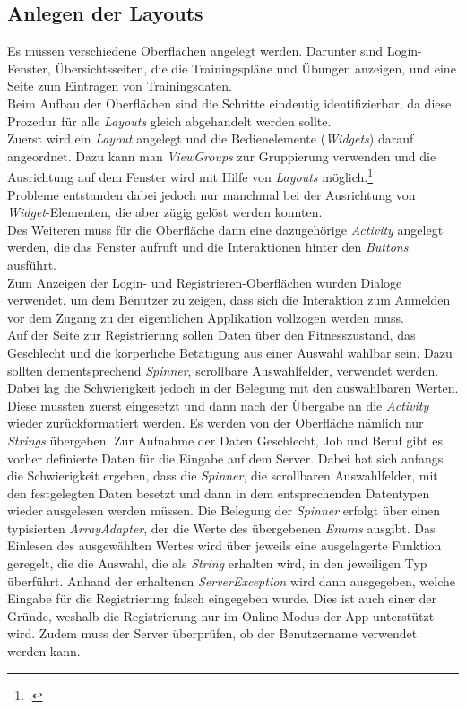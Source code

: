 \subsection{Anlegen der Layouts}
\label{ssec:nat-layouts}
Es müssen verschiedene Oberflächen angelegt werden. Darunter sind Login-Fenster, Übersichtsseiten, die die Trainingspläne und Übungen anzeigen, und eine Seite zum Eintragen von Trainingsdaten.\\
Beim Aufbau der Oberflächen sind die Schritte eindeutig identifizierbar, da diese Prozedur für alle \textit{Layouts} gleich abgehandelt werden sollte.\\
Zuerst wird ein \textit{Layout} angelegt und die Bedienelemente (\textit{Widgets}) darauf angeordnet. Dazu kann man \textit{ViewGroups} zur Gruppierung verwenden und die Ausrichtung auf dem Fenster wird mit Hilfe von \textit{Layouts} möglich.\footcite[Vgl. S. 58ff.]{Android-BeckerPant}\\
Probleme entstanden dabei jedoch nur manchmal bei der Ausrichtung von \textit{Widget}-Elementen, die aber zügig gelöst werden konnten.\\
Des Weiteren muss für die Oberfläche dann eine dazugehörige \textit{Activity} angelegt werden, die das Fenster aufruft und die Interaktionen hinter den \textit{Buttons} ausführt.\\
Zum Anzeigen der Login- und Registrieren-Oberflächen wurden Dialoge verwendet, um dem Benutzer zu zeigen, dass sich die Interaktion zum Anmelden vor dem Zugang zu der eigentlichen Applikation vollzogen werden muss.\\
Auf der Seite zur Registrierung sollen Daten über den Fitnesszustand, das Geschlecht und die körperliche Betätigung aus einer Auswahl wählbar sein. Dazu sollten dementsprechend \textit{Spinner}, scrollbare Auswahlfelder, verwendet werden. Dabei lag die Schwierigkeit jedoch in der Belegung mit den auswählbaren Werten. Diese mussten zuerst eingesetzt und dann nach der Übergabe an die \textit{Activity} wieder zurückformatiert werden. Es werden von der Oberfläche nämlich nur \textit{Strings} übergeben. 
Zur Aufnahme der Daten Geschlecht, Job und Beruf gibt es vorher definierte Daten für die Eingabe auf dem Server. Dabei hat sich anfangs die Schwierigkeit ergeben, dass die \textit{Spinner}, die scrollbaren Auswahlfelder, mit den festgelegten Daten besetzt und dann in dem entsprechenden Datentypen wieder ausgelesen werden müssen. Die Belegung der \textit{Spinner} erfolgt über einen typisierten \textit{ArrayAdapter}, der die Werte des übergebenen \textit{Enums} ausgibt. Das Einlesen des ausgewählten Wertes wird über jeweils eine ausgelagerte Funktion geregelt, die die Auswahl, die als \textit{String} erhalten wird, in den jeweiligen Typ überführt. Anhand der erhaltenen \textit{ServerException} wird dann ausgegeben, welche Eingabe für die Registrierung falsch eingegeben wurde. Dies ist auch einer der Gründe, weshalb die Registrierung nur im Online-Modus der App unterstützt wird. Zudem muss der Server überprüfen, ob der Benutzername verwendet werden kann.\\
